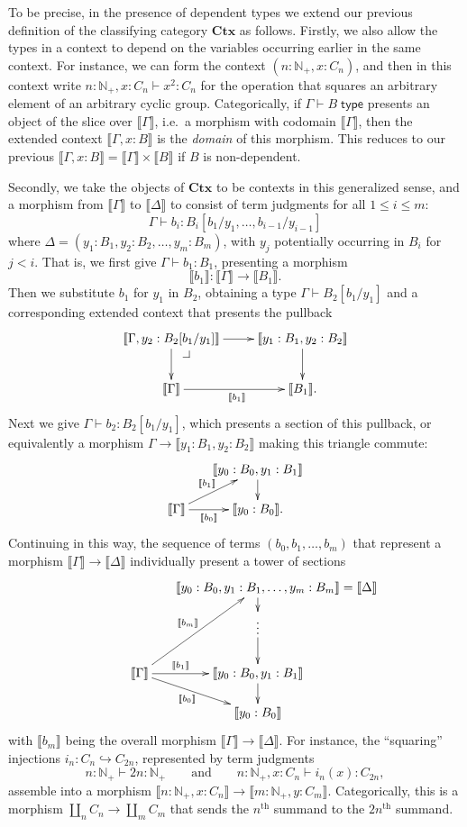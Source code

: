 \documentclass[12pt]{article}
\makeatletter
\newcommand{\pullback}[1][dr]{\save*!/#1-1.7pc/#1:(-1,1)@^{|-}\restore}
\def\ty{\;\mathsf{type}}
\def\m#1{\llbracket#1\rrbracket}
\def\Np{\mathbb{N}_+}
\def\types{\vdash}
\def\Ctx{\mathbf{Ctx}}
\numberwithin{equation}{section}
\makeatother
\begin{document}
To be precise, in the presence of dependent types we extend our previous definition of the classifying category $\Ctx$ as follows.
Firstly, we also allow the types in a context to depend on the variables occurring earlier in the same context.
For instance, we can form the context $(n:\Np, x:C_n)$, and then in this context write $n:\Np, x:C_n \types x^2 : C_n$ for the operation that squares an arbitrary element of an arbitrary cyclic group.
Categorically, if $\Gamma\types B\ty$ presents an object of the slice over $\m\Gamma$, i.e.\ a morphism with codomain $\m\Gamma$, then the extended context $\m{\Gamma,x:B}$ is the \emph{domain} of this morphism.
This reduces to our previous $\m{\Gamma,x:B} = \m\Gamma\times \m B$ if $B$ is non-dependent.

Secondly, we take the objects of $\Ctx$ to be contexts in this generalized sense, and a morphism from $\m{\Gamma}$ to $\m{\Delta}$ to consist of term judgments for all $1\le i\le m$:
\[\Gamma \types b_i : B_i[b_1/y_1,\dots,b_{i-1}/y_{i-1}]\]
where $\Delta = (y_1:B_1, y_2:B_2,\dots, y_m:B_m)$, with $y_j$ potentially occurring in $B_i$ for $j<i$.
That is, we first give $\Gamma\types b_1:B_1$, presenting a morphism
\[\m{b_1} : \m\Gamma\to\m{B_1}. \]
Then we substitute $b_1$ for $y_1$ in $B_2$, obtaining a type $\Gamma\types B_2[b_1/y_1]$ and a corresponding extended context that presents the pullback
\[ \xymatrix{ \m{\Gamma, y_2:B_2[b_1/y_1]} \ar[r] \ar[d] \pullback & \m{y_1:B_1, y_2:B_2} \ar[d]\\
  \m\Gamma \ar[r]_{\m{b_1}} & \m{B_1}. } \]
Next we give $\Gamma \types b_2 : B_2[b_1/y_1]$, which presents a section of this pullback, or equivalently a morphism $\Gamma \to \m{y_1:B_1, y_2:B_2}$ making this triangle commute:
\[ \xymatrix@-.7pc{
& \m{y_0:B_0, y_1:B_1} \ar[d] \\
\m{\Gamma} \ar[r]_-{\m{b_0}} \ar[ur]^-{\m{b_1}} 
& \m{y_0:B_0}. } \]
Continuing in this way, the sequence of terms $(b_0,b_1,\dots,b_m)$ that represent a morphism $\m \Gamma \to \m\Delta$ individually present a tower of sections
\[ \xymatrix@-.7pc{
& \m{y_0:B_0, y_1:B_1,\dots, y_m:B_m} \mathrlap{\;=\m\Delta} \ar[d] \\
& \vdots \ar[d] \\
\m{\Gamma} \ar[dr]_-{\m{b_0}} \ar[r]^-{\m{b_1}} \ar[uur]^-{\m{b_m}} & \m{y_0:B_0, y_1:B_1} \ar[d] \\
& \m{y_0:B_0} } \]
with $\m{b_m}$ being the overall morphism $\m\Gamma\to\m\Delta$.
For instance, the ``squaring'' injections $i_n:C_n \hookrightarrow C_{2n}$, represented by term judgments
\[n:\Np \types 2n:\Np
\qquad\text{and}\qquad
n:\Np, x:C_n \types i_n(x) : C_{2n},\]
assemble into a morphism $\m{n:\Np, x:C_n} \to \m{m:\Np, y:C_m}$.
Categorically, this is a morphism $\coprod_n C_n \to \coprod_m C_m$ that sends the $n^{\mathrm{th}}$ summand to the $2n^{\mathrm{th}}$ summand.
\end{document}
